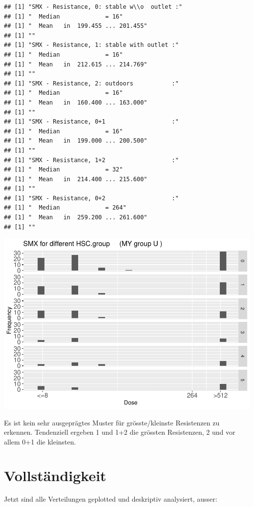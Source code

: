 \documentclass[
]{article}
\begin{document}
\begin{verbatim}
## [1] "SMX - Resistance, 0: stable w\\o  outlet :"
## [1] "  Median             = 16"
## [1] "  Mean   in  199.455 ... 201.455"
## [1] ""
## [1] "SMX - Resistance, 1: stable with outlet :"
## [1] "  Median             = 16"
## [1] "  Mean   in  212.615 ... 214.769"
## [1] ""
## [1] "SMX - Resistance, 2: outdoors           :"
## [1] "  Median             = 16"
## [1] "  Mean   in  160.400 ... 163.000"
## [1] ""
## [1] "SMX - Resistance, 0+1                   :"
## [1] "  Median             = 16"
## [1] "  Mean   in  199.000 ... 200.500"
## [1] ""
## [1] "SMX - Resistance, 1+2                   :"
## [1] "  Median             = 32"
## [1] "  Mean   in  214.400 ... 215.600"
## [1] ""
## [1] "SMX - Resistance, 0+2                   :"
## [1] "  Median             = 264"
## [1] "  Mean   in  259.200 ... 261.600"
## [1] ""
\end{verbatim}

\includegraphics{Verteilungen_files/figure-latex/unnamed-chunk-56-1.pdf}

Es ist kein sehr ausgeprägtes Muster für grösste/kleinste Resistenzen zu
erkennen. Tendenziell ergeben 1 und 1+2 die grössten Resistenzen, 2 und
vor allem 0+1 die kleinsten.

\hypertarget{vollstuxe4ndigkeit}{%
\section{Vollständigkeit}\label{vollstuxe4ndigkeit}}

Jetzt sind alle Verteilungen geplotted und deskriptiv analysiert,
ausser:
\end{document}
